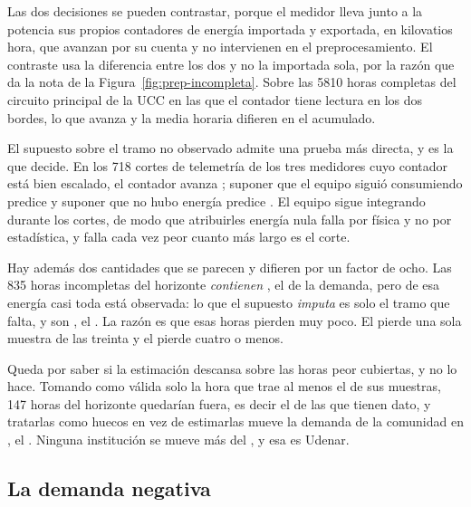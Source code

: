 \begin{guardado}
\begin{detallebox}

Las dos decisiones se pueden contrastar, porque el medidor lleva junto a la
potencia sus propios contadores de energía importada y exportada, en
kilovatios hora, que avanzan por su cuenta y no intervienen en el
preprocesamiento. El contraste usa la diferencia entre los dos y no la
importada sola, por la razón que da la nota de la
Figura~\ref{fig:prep-incompleta}. Sobre las \num{5810} horas completas del
circuito principal de la UCC en las que el contador tiene lectura en los dos
bordes, lo que avanza y la media horaria difieren en el 
acumulado.

El supuesto sobre el tramo no observado admite una prueba más directa, y es
la que decide. En los \num{718} cortes de telemetría de los tres medidores
cuyo contador está bien escalado, el contador avanza ;
suponer que el equipo siguió consumiendo predice  y suponer
que no hubo energía predice . El equipo sigue integrando
durante los cortes, de modo que atribuirles energía nula falla por física y
no por estadística, y falla cada vez peor cuanto más largo es el corte.

Hay además dos cantidades que se parecen y difieren por un factor de ocho. Las \num{835} horas incompletas del horizonte
\emph{contienen} , el  de la demanda, pero de esa
energía casi toda está observada: lo que el supuesto \emph{imputa} es solo
el tramo que falta, y son , el . La razón es que
esas horas pierden muy poco. El  pierde una sola muestra de las
treinta y el  pierde cuatro o menos.

Queda por saber si la estimación descansa sobre las horas peor cubiertas, y
no lo hace. Tomando como válida solo la hora que trae al menos el 
de sus muestras, \num{147} horas del horizonte quedarían fuera, es decir el
 de las que tienen dato, y tratarlas como huecos en vez de
estimarlas mueve la demanda de la comunidad en , el
. Ninguna institución se mueve más del , y esa es
Udenar.
\end{detallebox}
\end{guardado}



\subsection{La demanda negativa}
\label{sub:prep-negativa}


